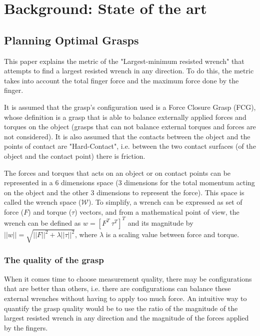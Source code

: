 
\chapter{Background: State of the art}
\label{chapter:evaluation}
\section{Planning Optimal Grasps \cite{ferrari1992planning}}

This paper explains the metric of the "Largest-minimum resisted wrench" that attempts to find a largest resisted wrench in any direction. To do this, the metric takes into account the total finger force and the maximum force done by the finger.
\par
It is assumed that the grasp's configuration used is a Force Closure Grasp (FCG), whose definition is a grasp that is able to balance externally applied forces and torques on the object (grasps that can not balance external torques and forces are not considered).
It is also assumed that the contacts between the object and the points of contact are "Hard-Contact", i.e. between the two contact surfaces (of the object and the contact point) there is friction.
\par
The forces and torques that acts on an object or on contact points can be represented in a 6 dimensions space (3 dimensions for the total momentum acting on the object and the other 3 dimensions to represent the force). This space is called the wrench space ($\mathcal{W}$). To simplify, a wrench can be expressed as set of force ($F$) and torque ($\tau$) vectors, and from a mathematical point of view, the wrench can be defined as $w = [F^T\ \tau^T]^T$ and its magnitude by $||w|| = \sqrt{||F||^2 + \lambda||\tau||^2}$, where $\lambda$ is a scaling value between force and torque.

\subsection{The quality of the grasp}
When it comes time to choose measurement quality, there may be configurations that are better than others, i.e. there are configurations can balance these external wrenches without having to apply too much force. An intuitive way to quantify the grasp quality would be to use the ratio of the magnitude of the largest resisted wrench in any direction and the magnitude of the forces applied by the fingers.

